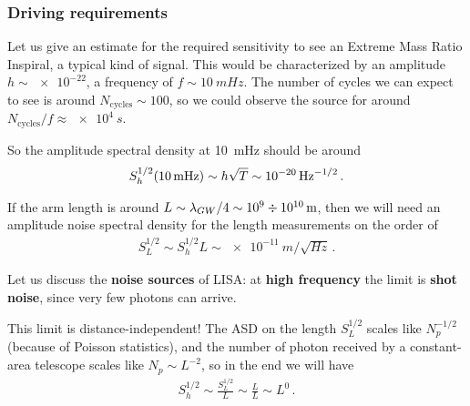 \documentclass[main.tex]{subfiles}
\begin{document}

\subsubsection{Driving requirements}

Let us give an estimate for the required sensitivity to see an Extreme Mass Ratio Inspiral, a typical kind of signal. 
This would be characterized by an amplitude \(h \sim \num{e-22}\), a frequency of \(f \sim \SI{10}{mHz}\). The number of cycles we can expect to see is around \(N _{\text{cycles}} \sim 100\), so we could observe the source for around \(N _{\text{cycles}} / f \approx \SI{e4}{s}\). 

So the amplitude spectral density at \SI{10}{mHz} should be around 
%
\begin{align}
S^{1/2}_{h} \qty(\SI{10}{mHz}) \sim h \sqrt{T} \sim \SI{e-20}{Hz^{-1/2}}
\,.
\end{align}

If the arm length is around \(L \sim \lambda_{GW} / 4 \sim \num{e9} \divisionsymbol \SI{e10}{m}\), then we will need an amplitude noise spectral density for the length measurements on the order of 
%
\begin{align}
S^{1/2}_{L} \sim S^{1/2}_{h} L \sim \SI{e-11}{m / \sqrt{Hz}} 
\,.
\end{align}

Let us discuss the \textbf{noise sources} of LISA: at \textbf{high frequency} the limit is \textbf{shot noise}, since very few photons can arrive. 

This limit is distance-independent! The ASD on the length \(S^{1/2}_{L}\) scales like \(N_p^{-1/2}\) (because of Poisson statistics), and the number of photon received by a constant-area telescope scales like \(N_p \sim L^{-2}\), so in the end we will have 
%
\begin{align}
S^{1/2}_{h} \sim \frac{S^{1/2}_{L}}{L} \sim \frac{L}{L} \sim L^{0}
\,.
\end{align}
\end{document}
